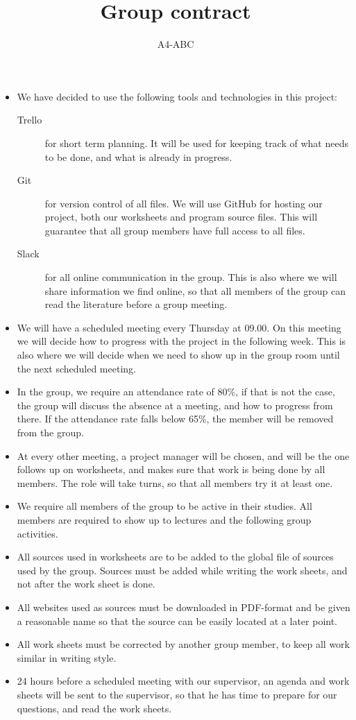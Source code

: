 \documentclass[a4paper,12pt,hidelinks]{article}
\newcommand{\group}{A4-ABC}
\begin{document}
	\title{Group contract}
	\author{\group}
	\maketitle

	\begin{itemize}
		\item We have decided to use the following tools and technologies in this project:
		\begin{description}
			\item[Trello] for short term planning. It will be used for keeping track of what needs to be done, and what is already in progress.
			\item[Git] for version control of all files. We will use GitHub for hosting our project, both our worksheets and program source files. This will guarantee that all group members have full access to all files.
			\item[Slack] for all online communication in the group. This is also where we will share information we find online, so that all members of the group can read the literature before a group meeting. 
		\end{description}
		\item We will have a scheduled meeting every Thursday at 09.00. On this meeting we will decide how to progress with the project in the following week. This is also where we will decide when we need to show up in the group room until the next scheduled meeting.
		\item In the group, we require an attendance rate of 80\%, if that is not the case, the group will discuss the absence at a meeting, and how to progress from there. If the attendance rate falls below 65\%, the member will be removed from the group.
		\item At every other meeting, a project manager will be chosen, and will be the one follows up on worksheets, and makes sure that work is being done by all members. The role will take turns, so that all members try it at least one.
		\item We require all members of the group to be active in their studies. All members are required to show up to lectures and the following group activities.
		\item All sources used in worksheets are to be added to the global file of sources used by the group. Sources must be added while writing the work sheets, and not after the work sheet is done. 
		\item All websites used as sources must be downloaded in PDF-format and be given a reasonable name so that the source can be easily located at a later point.
		\item All work sheets must be corrected by another group member, to keep all work similar in writing style.
	\end{itemize}

	\begin{itemize}
		\item 24 hours before a scheduled meeting with our supervisor, an agenda and work sheets will be sent to the supervisor, so that he has time to prepare for our questions, and read the work sheets.
	\end{itemize}
\end{document}
